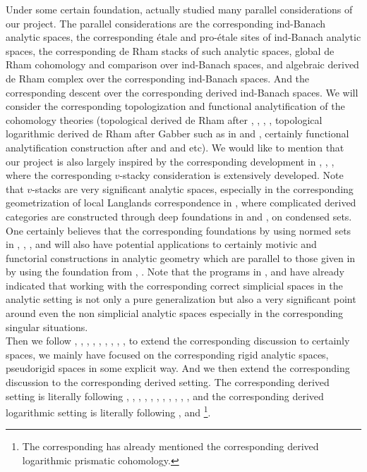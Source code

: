 \documentclass[11pt]{book}
\theoremstyle{definition}
\numberwithin{equation}{section}
\begin{document}
\indent Under some certain foundation, \cite{12Pau1} actually studied many parallel considerations of our project. The parallel  considerations are the corresponding ind-Banach analytic spaces, the corresponding \'etale and pro-\'etale sites of ind-Banach analytic spaces, the corresponding de Rham stacks of such analytic spaces, global de Rham cohomology and comparison over ind-Banach spaces, and algebraic derived de Rham complex over the corresponding ind-Banach spaces. And the corresponding descent over the corresponding derived ind-Banach spaces. We will consider the corresponding topologization and functional analytification of the cohomology theories (topological derived de Rham after \cite{12B1}, \cite{12Bei},  \cite{12GL}, \cite{12Ill1}, \cite{12Ill2} topological logarithmic derived de Rham after Gabber such as in \cite{12B1} and \cite{12O}, certainly functional analytification construction after \cite{12KL1} and \cite{12KL2} and etc).  We would like to mention that our project is also largely inspired by the corresponding development in \cite{12CS1}, \cite{12CS2}, \cite{12FS}, \cite{12Sch2} where the corresponding $v$-stacky consideration is extensively developed. Note that $v$-stacks are very significant analytic spaces, especially in the corresponding geometrization of local Langlands correspondence in \cite{12FS}, where complicated derived categories are constructed through deep foundations in \cite{12Sch2} and \cite{12CS1}, \cite{12CS2} on condensed sets. One certainly believes that the corresponding foundations by using normed sets in \cite{12BBBK}, \cite{12BBK}, \cite{BBM}, \cite{12BK} and \cite{KKM} will also have potential applications to certainly motivic and functorial constructions in analytic geometry which are parallel to those given in \cite{M} by using the foundation from \cite{12CS1}, \cite{12CS2}. Note that the programs in \cite{12B1}, \cite{12BMS} and \cite{12BS} have already indicated that working with the corresponding correct simplicial spaces in the analytic setting is not only a pure generalization but also a very significant point around even the non simplicial analytic spaces especially in the corresponding singular situations.\\



\indent Then we follow \cite{12An1}, \cite{12An2}, \cite{12B1}, \cite{12Bei}, \cite{12BS}, \cite{12G1}, \cite{12GL}, \cite{12Ill1}, \cite{12Ill2}, \cite{12Qui}  to extend the corresponding discussion to certainly spaces, we mainly have focused on the corresponding rigid analytic spaces, pseudorigid spaces in some explicit way. And we then extend the corresponding discussion to the corresponding derived setting. The corresponding derived setting is literally following \cite{12An1}, \cite{12An2}, \cite{12B1}, \cite{12B2}, \cite{12Bei}, \cite{12BMS}, \cite{12BS}, \cite{12G1}, \cite{12GL}, \cite{12Ill1}, \cite{12Ill2}, \cite{12Qui} and the corresponding derived logarithmic setting is literally following \cite{12B1}, \cite{12Ko1} and \cite{12O}\footnote{The corresponding \cite{12Ko1} has already mentioned the corresponding derived logarithmic prismatic cohomology.}. \\
\end{document}
